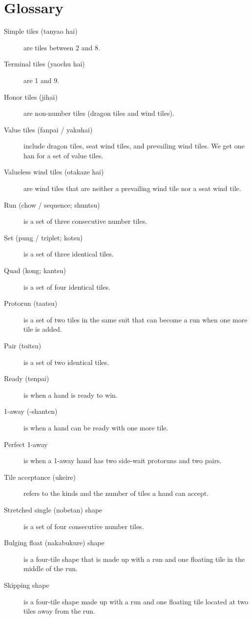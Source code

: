 \clearpage

\section{Glossary}

\begin{description}
\item[Simple tiles ({\jap tanyao hai})] are tiles between 2 and 8.
\item[Terminal tiles ({\jap yaochu hai})] are 1 and 9.
\item[Honor tiles ({\jap jihai})] are non-number tiles (dragon tiles and wind tiles).
\item[Value tiles ({\jap fanpai} / {\jap yakuhai})] include dragon tiles, seat wind tiles, and prevailing wind tiles. We get one {\jap han} for a set of value tiles. 
\item[Valueless wind tiles ({\jap otakaze hai})] are wind tiles that are neither a prevailing wind tile nor a seat wind tile.
\item[Run (chow / sequence; {\jap shuntsu})] is a set of three consecutive number tiles.
\item[Set (pung / triplet; {\jap kotsu})] is a set of three identical tiles. 
\item[Quad (kong; {\jap kantsu})] is a set of four identical tiles. 
\item[Protorun ({\jap taatsu})] is a set of two tiles in the same suit that can become a run when one more tile is added. 
\item[Pair ({\jap toitsu})] is a set of two identical tiles. 
\item[Ready ({\jap tenpai})] is when a hand is ready to win. 
\item[1-away ({-shanten})] is when a hand can be ready with one more tile. 
\item[Perfect 1-away] is when a 1-away hand has two side-wait protoruns and two pairs.
\item[Tile acceptance ({\jap ukeire})] refers to the kinds and the number of tiles a hand can accept.
\item[Stretched single ({\jap nobetan}) shape] is a set of four consecutive number tiles. 
\item[Bulging float ({\jap nakabukure}) shape] is a four-tile shape that is made up with a run and one floating tile in the middle of the run.
\item[Skipping shape] is a four-tile shape made up with a run and one floating tile located at two tiles away from the run.
\end{description}

